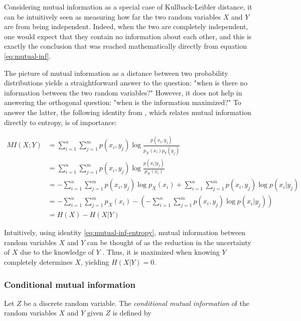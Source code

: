 \documentclass[12pt]{article}
\begin{document}
Considering mutual information as a special case of Kullback-Leibler distance, it can be intuitively seen as measuring how far the two random variables $X$ and $Y$ are from being independent. Indeed, when the two are completely independent, one would expect that they contain no information about each other, and this is exactly the conclusion that was reached mathematically directly from equation \ref{eq:mutual-inf}.

The picture of mutual information as a distance between two probability distributions yields a straightforward answer to the question: "when is there no information between the two random variables?" However, it does not help in answering the orthogonal question: "when is the information maximized?" To answer the latter, the following identity from \cite{cover-thomas}, which relates mutual information directly to entropy, is of importance: 

\begin{equation}
\begin{split}
MI(X;Y) & = \sum_{i=1}^n \sum_{j=1}^m p(x_i,y_j) \log \frac{p(x_i,y_j)}{p_X(x_i)p_Y(y_j)} \\
		& = \sum_{i=1}^n \sum_{j=1}^m p(x_i, y_j) \log \frac{p(x_i|y_j)}{p_X(x_i)} \\ 
 		& = -\sum_{i=1}^n \sum_{j=1}^m p(x_i,y_j) \log p_X(x_i) +\sum_{i=1}^n \sum_{j=1}^m p(x_i,y_j) \log p(x_i|y_j) \\
 		& = -\sum_{i=1}^n \sum_{j=1}^m p_X(x_i) - \left( - \sum_{i=1}^n \sum_{j=1}^m p(x_i,y_j) \log p(x_i|y_j) \right) \\ 
 		& = H(X) - H(X|Y)
\label{eq:mutual-inf-entropy} 
\end{split}
\end{equation}

Intuitively, using identity \ref{eq:mutual-inf-entropy}, mutual information between random variables $X$ and $Y$ can be thought of as the reduction in the uncertainty of $X$ due to the knowledge of $Y$ \cite{cover-thomas}. Thus, it is maximized when knowing $Y$ completely determines $X$, yielding $H(X|Y) = 0$.  

\subsubsection{Conditional mutual information}

Let $Z$ be a discrete random variable. The \textit{conditional mutual information} \cite{cover-thomas} of the random variables $X$ and $Y$ given $Z$ is defined by 
\end{document}
